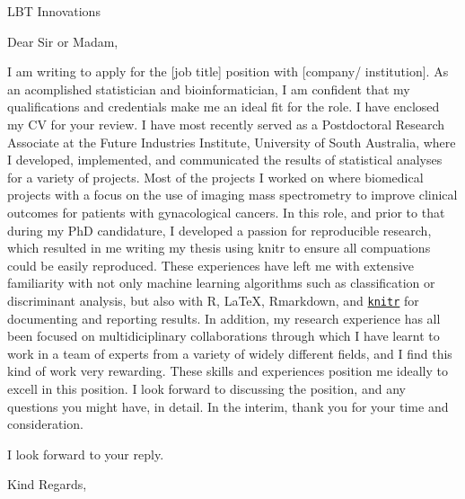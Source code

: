 \documentclass[a4paper, 12pt]{letter}
\begin{document}
\begin{letter}{LBT Innovations}

\opening{Dear Sir or Madam,}

I am writing to apply for the [job title] position with [company/ institution]. As an acomplished statistician and bioinformatician, I am confident that my qualifications and credentials make me an ideal fit for the role. I have enclosed my CV for your review. I have most recently served as a Postdoctoral Research Associate at the Future Industries Institute, University of South Australia, where I developed, implemented, and communicated the results of statistical analyses for a variety of projects. Most of the projects I worked on where biomedical projects with a focus on the use of imaging mass spectrometry to improve clinical outcomes for patients with gynacological cancers. In this role, and prior to that during my PhD candidature, I developed a passion for reproducible research, which resulted in me writing my thesis using knitr to ensure all compuations could be easily reproduced. These experiences have left me with extensive familiarity with not only machine learning algorithms such as classification or discriminant analysis, but also with R, \LaTeX, Rmarkdown, and \href{https://yihui.name/knitr/}{\texttt{knitr}} for documenting and reporting results. In addition, my research experience has all been focused on multidiciplinary collaborations through which I have learnt to work in a team of experts from a variety of widely different fields, and I find this kind of work very rewarding. These skills and experiences position me ideally to excell in this position. I look forward to discussing the position, and any questions you might have, in detail. In the interim, thank you for your time and consideration.

I look forward to your reply.

\closing{Kind Regards,}

%
%

\end{letter}
\end{document}
